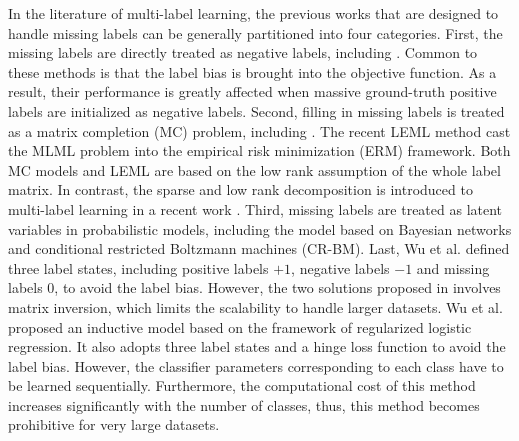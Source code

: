 \documentclass[twocolumn]{svjour3}          %
\begin{document}
In the literature of multi-label learning, the previous works that are designed to handle missing labels can be generally partitioned into four categories.
%
First, the missing labels are directly treated as negative labels,  including \cite{semi-multi-label-sdm-2008,well-multi-label-weak-2010,bucak-multi-incomplete-2011,fasttag-icml-2013,Agrawal-ml-million-label-www-2013,hash-multi-label-eccv-2014a,hash-multi-label-eccv-2014b,multilabel-link-prediction-aaai2015}.
Common to these methods is that the label bias is brought into the objective function. 
As a result, their performance is greatly affected when massive ground-truth positive labels are initialized as negative labels.
%
%
Second, filling in missing labels is treated as a matrix completion (MC) problem, including \cite{MC-nips-2010,MC-Pos-nips-2011,MC-speed-nips-2013}.
The recent LEML method \cite{LEML-ICML-2014} cast the MLML problem into the empirical risk minimization (ERM) framework.
Both MC models and LEML are based on the low rank assumption of the whole label matrix. 
In contrast, the sparse and low rank decomposition is introduced to multi-label learning in a recent work \cite{multilabel-low-rank-sparse-kdd-2016}.
%
Third, missing labels are treated as latent variables in probabilistic models, including the model based on Bayesian networks 
\cite{multilabel-compressed-sensing-nips-2012,bml-cs-active-kdd-2014} 
and conditional restricted Boltzmann machines (CR-BM).  
%
Last, Wu et al. \cite{my-icpr-2014} defined three label states, including positive labels $+1$, negative labels $-1$ and missing labels $0$, to avoid the label bias. 
 However, the two solutions proposed in \cite{my-icpr-2014} involves matrix inversion, which limits the scalability to handle larger datasets.
%
Wu et al. \cite{my-pr-2015} proposed an inductive model based on the framework of regularized logistic regression. It also adopts three label states and a hinge loss function to avoid the label bias. However, the classifier parameters corresponding to each class have to be learned sequentially. 
Furthermore, the computational cost of this method increases significantly with the number of classes, thus, this method becomes prohibitive for very large datasets. 
\end{document}
